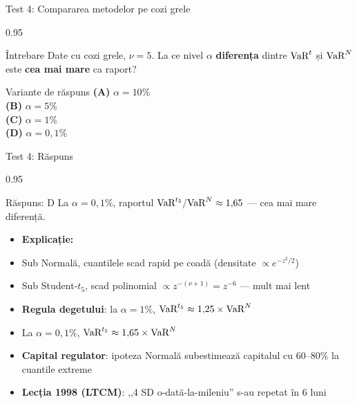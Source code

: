 \documentclass[9pt, aspectratio=169, t]{beamer}
\begin{document}
\begin{frame}[shrink=10]{Test 4: Compararea metodelor pe cozi grele}
\begin{cminipage}{0.95\textwidth}
    \begin{alertblock}{Întrebare}
    Date cu cozi grele, $\nu = 5$. La ce nivel $\alpha$ \textbf{diferența} dintre $\text{VaR}^{t}$ și $\text{VaR}^{N}$ este \textbf{cea mai mare} ca raport?
    \end{alertblock}
    \vspace{0.4cm}
    \begin{block}{Variante de răspuns}
    \textcolor{MainBlue}{\textbf{(A)}} $\alpha = 10\%$ \\[3pt]
    \textcolor{MainBlue}{\textbf{(B)}} $\alpha = 5\%$ \\[3pt]
    \textcolor{MainBlue}{\textbf{(C)}} $\alpha = 1\%$ \\[3pt]
    \textcolor{MainBlue}{\textbf{(D)}} $\alpha = 0{,}1\%$
    \end{block}
\end{cminipage}
\end{frame}

\begin{frame}[shrink=10]{Test 4: Răspuns}
\begin{cminipage}{0.95\textwidth}
    \begin{exampleblock}{Răspuns: D}
    La $\alpha = 0{,}1\%$, raportul $\text{VaR}^{t_5}/\text{VaR}^{N} \approx 1{,}65$ --- cea mai mare diferență.
    \end{exampleblock}
    \vspace{0.2cm}
    \begin{itemize}\setlength{\itemsep}{0pt}
        \item \textbf{Explicație:}
        \item Sub Normală, cuantilele scad rapid pe coadă (densitate $\propto e^{-z^2/2}$)
        \item Sub Student-$t_5$, scad polinomial $\propto z^{-(\nu+1)} = z^{-6}$ --- mult mai lent
        \item \textbf{Regula degetului}: la $\alpha = 1\%$, $\text{VaR}^{t_5} \approx 1{,}25 \times \text{VaR}^{N}$
        \item La $\alpha = 0{,}1\%$, $\text{VaR}^{t_5} \approx 1{,}65 \times \text{VaR}^{N}$
        \item \textbf{Capital regulator}: ipoteza Normală subestimează capitalul cu 60--80\% la cuantile extreme
        \item \textbf{Lecția 1998 (LTCM)}: ,,4 SD o-dată-la-mileniu'' s-au repetat în 6 luni
    \end{itemize}
\end{cminipage}
\end{frame}
\end{document}
